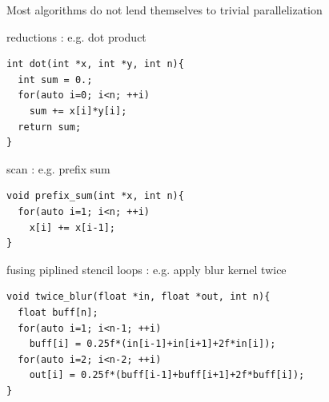 
\begin{frame}[fragile]{}
    \centering
    Most algorithms do not lend themselves to trivial parallelization

    \begin{code}{reductions : e.g. dot product}
        \begin{lstlisting}[style=boxcudatiny]
int dot(int *x, int *y, int n){
  int sum = 0.;
  for(auto i=0; i<n; ++i)
    sum += x[i]*y[i];
  return sum;
}
        \end{lstlisting}
    \end{code}
\vspace{-7pt}
        \begin{code}{scan : e.g. prefix sum}
            \begin{lstlisting}[style=boxcudatiny]
void prefix_sum(int *x, int n){
  for(auto i=1; i<n; ++i)
    x[i] += x[i-1];
}
        \end{lstlisting}
    \end{code}
\vspace{-7pt}
    \begin{code}{fusing piplined stencil loops : e.g. apply blur kernel twice}
        \begin{lstlisting}[style=boxcudatiny]
void twice_blur(float *in, float *out, int n){
  float buff[n];
  for(auto i=1; i<n-1; ++i)
    buff[i] = 0.25f*(in[i-1]+in[i+1]+2f*in[i]);
  for(auto i=2; i<n-2; ++i)
    out[i] = 0.25f*(buff[i-1]+buff[i+1]+2f*buff[i]);
}
        \end{lstlisting}
    \end{code}

\end{frame}

